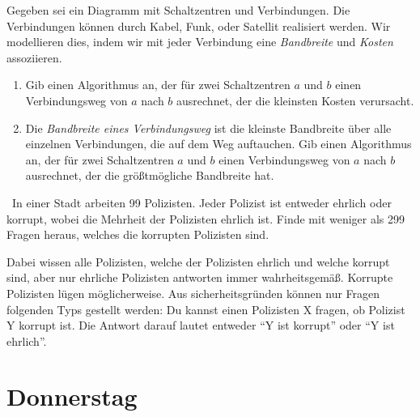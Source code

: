 \documentclass{uebung_cs}
\begin{document}
\begin{aufgabe}[Telefonnetzwerk]
    Gegeben sei ein Diagramm mit Schaltzentren und Verbindungen.
    Die Verbindungen können durch Kabel, Funk, oder Satellit realisiert werden.
    Wir modellieren dies, indem wir mit jeder Verbindung eine \emph{Bandbreite} und \emph{Kosten} assoziieren.
    \begin{enumerate}
        \item Gib einen Algorithmus an, der für zwei Schaltzentren $a$ und $b$ einen Verbindungsweg von $a$ nach $b$ ausrechnet, der die kleinsten Kosten verursacht.
        \item Die \emph{Bandbreite eines Verbindungsweg} ist die kleinste Bandbreite über alle einzelnen Verbindungen, die auf dem Weg auftauchen.
        Gib einen Algorithmus an, der für zwei Schaltzentren $a$ und $b$ einen Verbindungsweg von $a$ nach $b$ ausrechnet, der die größtmögliche Bandbreite hat.
    \end{enumerate}
\end{aufgabe}

\begin{aufgabe}\
  In einer Stadt arbeiten 99 Polizisten.
  Jeder Polizist ist entweder ehrlich oder korrupt, wobei die Mehrheit der Polizisten ehrlich ist.
  Finde mit weniger als 299 Fragen heraus, welches die korrupten Polizisten sind.
  
  Dabei wissen alle Polizisten, welche der Polizisten ehrlich und welche korrupt sind, aber nur ehrliche Polizisten antworten immer wahrheitsgemäß.
  Korrupte Polizisten lügen möglicherweise.
  Aus sicherheitsgründen können nur Fragen folgenden Typs gestellt werden: Du kannst einen Polizisten X fragen, ob Polizist Y korrupt ist.
  Die Antwort darauf lautet entweder \enquote{Y ist korrupt} oder \enquote{Y ist ehrlich}.

\end{aufgabe}

\section*{Donnerstag}
\end{document}
